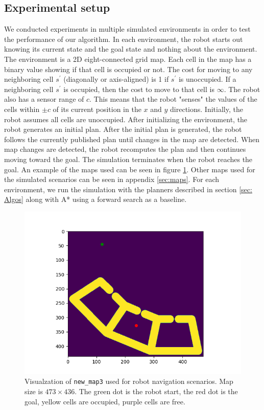 \documentclass{article}
\begin{document}
\subsection{Experimental setup}
\quad We conducted experiments in multiple simulated environments in order to test the performance of our algorithm. In each environment, the robot starts out knowing its current state and the goal state and nothing about the environment. The environment is a 2D eight-connected grid map. Each cell in the map has a binary value showing if that cell is occupied or not. The cost for moving to any neighboring cell $s^{'}$ (diagonally or axis-aligned) is 1 if $s^{'}$ is unoccupied. If a neighboring cell $s^{'}$ is occupied, then the cost to move to that cell is $\infty$.  The robot also has a sensor range of $c$. This means that the robot "senses" the values of the cells within $\pm c$ of its current position in the $x$ and $y$ directions. Initially, the robot assumes all cells are unoccupied. After initializing the environment, the robot generates an initial plan. After the initial plan is generated, the robot follows the currently published plan until changes in the map are detected. When map changes are detected, the robot recomputes the plan and then continues moving toward the goal. The simulation terminates when the robot reaches the goal. An example of the maps used can be seen in figure \ref{fig:ex-map}. Other maps used for the simulated scenarios can be seen in appendix \ref{sec:maps}. For each environment, we run the simulation with the planners described in section \ref{sec: Algos} along with A* using a forward search as a baseline.

\begin{figure}[H]
    \centering
    \includegraphics[width=0.8\linewidth]{new_map3.png}
    \caption{Visualzation of \texttt{new\_map3} used for robot navigation scenarios. Map size is $473 \times 436$. The green dot is the robot start, the red dot is the goal, yellow cells are occupied, purple cells are free.}
    \label{fig:ex-map}
\end{figure}
\end{document}
